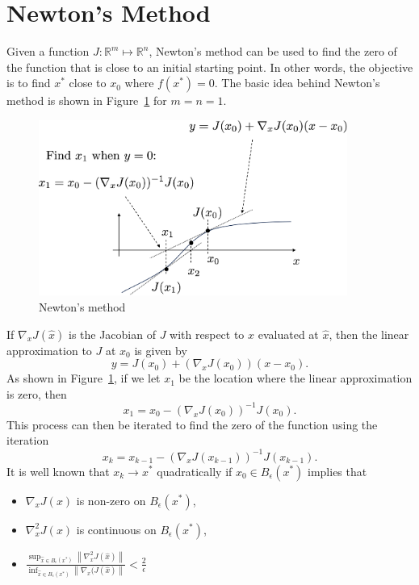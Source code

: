 \documentclass{article}
\newcommand{\norm}[1]{\left\|{#1}\right\|}
\begin{document}
\section{Newton's Method}

Given a function $J:\mathbb{R}^m\mapsto\mathbb{R}^n$, Newton's method can be used to find the zero of the function that is close to an initial starting point.  In other words, the objective is to find $x^\ast$ close to $x_0$ where $f(x^\ast)=0$.
The basic idea behind Newton's method is shown in Figure~\ref{fig:newtons_method} for $m=n=1$.
\begin{figure}[hbt]
  \includegraphics[width=0.9\textwidth]{figures/newtons_method}
  \caption{Newton's method}
  \label{fig:newtons_method}
\end{figure}
If $\nabla_x J(\hat{x})$ is the Jacobian of $J$ with respect to $x$ evaluated at $\hat{x}$, then the linear approximation to $J$ at $x_0$ is given by
\[
y = J(x_0) + \left(\nabla_x J(x_0)\right) (x-x_0).
\]
As shown in Figure~\ref{fig:newtons_method}, if we let $x_1$ be the location where the linear approximation is zero, then
\[
x_1 = x_0 - \left(\nabla_x J(x_0)\right)^{-1} J(x_0).
\]
This process can then be iterated to find the zero of the function using the iteration
\[
x_k = x_{k-1} - \left(\nabla_x J(x_{k-1})\right)^{-1} J(x_{k-1}).
\]
It is well known that $x_k\to x^\ast$ quadratically if $x_0\in B_{\epsilon}(x^\ast)$ implies that
\begin{itemize}
\item 	$\nabla_x J(x)$ is non-zero on $B_{\epsilon}(x^\ast)$, 
\item $\nabla_x^2 J(x)$ is continuous on $B_{\epsilon}(x^\ast)$,
\item $\frac{\sup_{\hat{x}\in B_{\epsilon}(x^\ast)}
       \norm{\nabla_x^2 J(\hat{x})}}
       {\inf_{\hat{x}\in B_{\epsilon}(x^\ast)}\norm{\nabla_x(J(\hat{x})}} < \frac{2}{\epsilon}
       $
\end{itemize}
\end{document}
